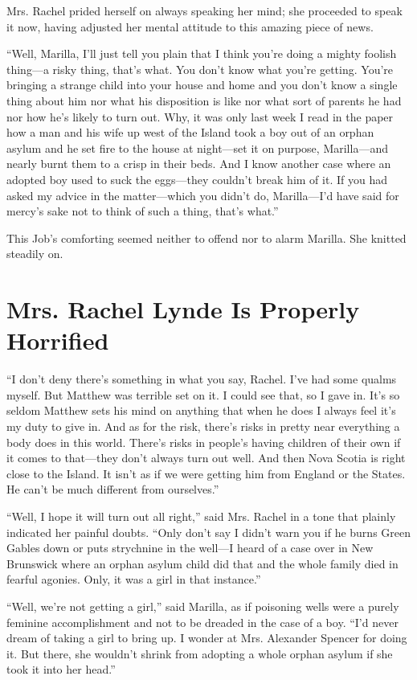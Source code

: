 \documentclass{article}
\begin{document}
Mrs. Rachel prided herself on always speaking her mind; she proceeded to speak it now, having adjusted her mental attitude to this amazing piece of news.

``Well, Marilla, I'll just tell you plain that I think you're doing a mighty foolish thing---a risky thing, that's what. You don't know what you're getting. You're bringing a strange child into your house and home and you don't know a single thing about him nor what his disposition is like nor what sort of parents he had nor how he's likely to turn out. Why, it was only last week I read in the paper how a man and his wife up west of the Island took a boy out of an orphan asylum and he set fire to the house at night---set it on purpose, Marilla---and nearly burnt them to a crisp in their beds. And I know another case where an adopted boy used to suck the eggs---they couldn't break him of it. If you had asked my advice in the matter---which you didn't do, Marilla---I'd have said for mercy's sake not to think of such a thing, that's what.''

This Job's comforting seemed neither to offend nor to alarm Marilla. She knitted steadily on.

\section{Mrs. Rachel Lynde Is Properly Horrified}
``I don't deny there's something in what you say, Rachel. I've had some qualms myself. But Matthew was terrible set on it. I could see that, so I gave in. It's so seldom Matthew sets his mind on anything that when he does I always feel it's my duty to give in. And as for the risk, there's risks in pretty near everything a body does in this world. There's risks in people's having children of their own if it comes to that---they don't always turn out well. And then Nova Scotia is right close to the Island. It isn't as if we were getting him from England or the States. He can't be much different from ourselves.''

``Well, I hope it will turn out all right,'' said Mrs. Rachel in a tone that plainly indicated her painful doubts. ``Only don't say I didn't warn you if he burns Green Gables down or puts strychnine in the well---I heard of a case over in New Brunswick where an orphan asylum child did that and the whole family died in fearful agonies. Only, it was a girl in that instance.''

``Well, we're not getting a girl,'' said Marilla, as if poisoning wells were a purely feminine accomplishment and not to be dreaded in the case of a boy. ``I'd never dream of taking a girl to bring up. I wonder at Mrs. Alexander Spencer for doing it. But there, she wouldn't shrink from adopting a whole orphan asylum if she took it into her head.''
\end{document}

